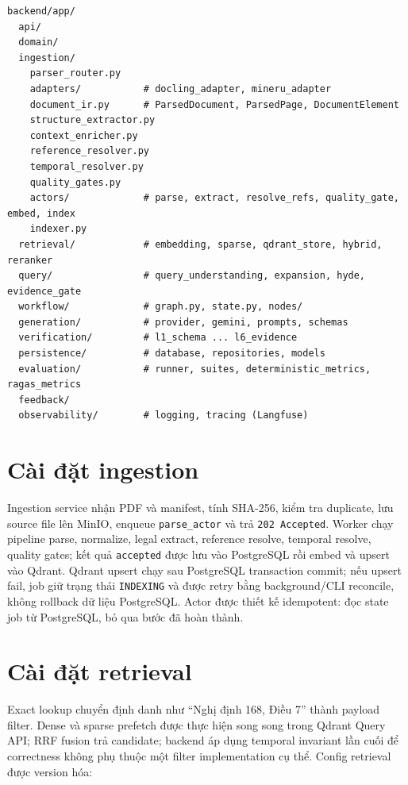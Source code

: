 \documentclass[a4paper,12pt]{extreport}
\newcommand{\code}[1]{\texttt{#1}}
\begin{document}
\begin{lstlisting}[caption={Cấu trúc backend rút gọn}]
backend/app/
  api/
  domain/
  ingestion/
    parser_router.py
    adapters/           # docling_adapter, mineru_adapter
    document_ir.py      # ParsedDocument, ParsedPage, DocumentElement
    structure_extractor.py
    context_enricher.py
    reference_resolver.py
    temporal_resolver.py
    quality_gates.py
    actors/             # parse, extract, resolve_refs, quality_gate, embed, index
    indexer.py
  retrieval/            # embedding, sparse, qdrant_store, hybrid, reranker
  query/                # query_understanding, expansion, hyde, evidence_gate
  workflow/             # graph.py, state.py, nodes/
  generation/           # provider, gemini, prompts, schemas
  verification/         # l1_schema ... l6_evidence
  persistence/          # database, repositories, models
  evaluation/           # runner, suites, deterministic_metrics, ragas_metrics
  feedback/
  observability/        # logging, tracing (Langfuse)
\end{lstlisting}

\section{Cài đặt ingestion}

Ingestion service nhận PDF và manifest, tính SHA-256, kiểm tra duplicate, lưu source file lên MinIO, enqueue \code{parse\_actor} và trả \code{202 Accepted}. Worker chạy pipeline parse, normalize, legal extract, reference resolve, temporal resolve, quality gates; kết quả \code{accepted} được lưu vào PostgreSQL rồi embed và upsert vào Qdrant. Qdrant upsert chạy sau PostgreSQL transaction commit; nếu upsert fail, job giữ trạng thái \code{INDEXING} và được retry bằng background/CLI reconcile, không rollback dữ liệu PostgreSQL. Actor được thiết kế idempotent: đọc state job từ PostgreSQL, bỏ qua bước đã hoàn thành.

\section{Cài đặt retrieval}

Exact lookup chuyển định danh như ``Nghị định 168, Điều 7'' thành payload filter. Dense và sparse prefetch được thực hiện song song trong Qdrant Query API; RRF fusion trả candidate; backend áp dụng temporal invariant lần cuối để correctness không phụ thuộc một filter implementation cụ thể. Config retrieval được version hóa:
\end{document}
